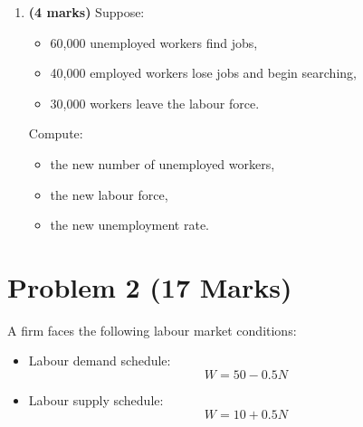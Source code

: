 \documentclass[12pt]{article}
\begin{document}
\begin{enumerate}[label=(\alph*)]
\begin{itemize}
    \item Compute the labour force.
    \item Compute the number of unemployed workers.
    \item Compute the number of employed workers.
\end{itemize}

\item \textbf{(4 marks)}  
Suppose:
\begin{itemize}
    \item 60,000 unemployed workers find jobs,
    \item 40,000 employed workers lose jobs and begin searching,
    \item 30,000 workers leave the labour force.
\end{itemize}

Compute:
\begin{itemize}
    \item the new number of unemployed workers,
    \item the new labour force,
    \item the new unemployment rate.
\end{itemize}

\end{enumerate}

\section*{Problem 2 (17 Marks)}

A firm faces the following labour market conditions:

\begin{itemize}
    \item Labour demand schedule:  
    \[
    W = 50 - 0.5N
    \]
    \item Labour supply schedule:  
    \[
    W = 10 + 0.5N
    \]
\end{itemize}
\end{document}
